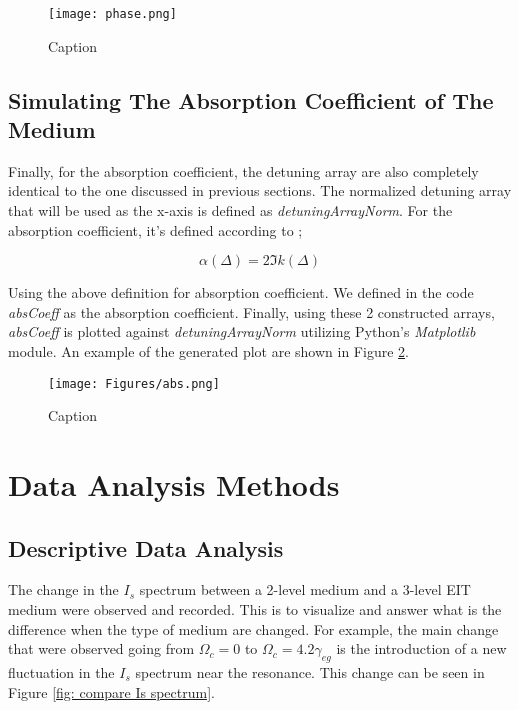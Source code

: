 \begin{figure}[h!]
    \centering
    \texttt{[image: phase.png]}
    \caption{Caption}
    \label{fig: phase}
\end{figure}

\subsection{Simulating The Absorption Coefficient of The Medium}
Finally, for the absorption coefficient, the detuning array are also completely identical to the one discussed in previous sections. The normalized detuning array that will be used as the x-axis is defined as \textit{detuningArrayNorm}. For the absorption coefficient, it's defined according to \cite{boyd2020nonlinear};

\begin{equation}
    \alpha(\Delta) = 2 \Im{k(\Delta)}
\end{equation}

Using the above definition for absorption coefficient. We defined in the code \textit{absCoeff} as the absorption coefficient. Finally, using these 2 constructed arrays, \textit{absCoeff} is plotted against \textit{detuningArrayNorm} utilizing Python's \textit{Matplotlib} module. An example of the generated plot are shown in Figure \ref{fig: abs}.

\begin{figure}[h!]
    \centering
    \texttt{[image: Figures/abs.png]}
    \caption{Caption}
    \label{fig: abs}
\end{figure}


\section{Data Analysis Methods}
\subsection{Descriptive Data Analysis}
The change in the $I_{s}$ spectrum between a 2-level medium and a 3-level EIT medium were observed and recorded. This is to visualize and answer what is the difference when the type of medium are changed. For example, the main change that were observed going from $\Omega_{c} = 0$ to $\Omega_{c} = 4.2\gamma_{eg}$ is the introduction of a new fluctuation in the $I_{s}$ spectrum near the resonance. This change can be seen in Figure \ref{fig: compare Is spectrum}. 

